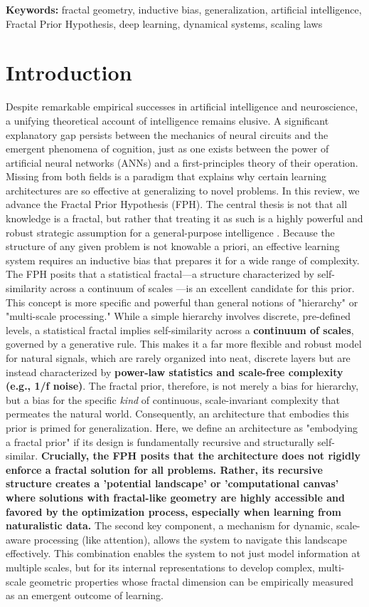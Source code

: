 \documentclass[11pt,a4paper]{article}
\newcommand{\keywords}[1]{%
\begin{center}
\small\textbf{Keywords:} #1
\end{center}
}
\begin{document}
\keywords{fractal geometry, inductive bias, generalization, artificial intelligence, Fractal Prior Hypothesis, deep learning, dynamical systems, scaling laws}

\section{Introduction}
Despite remarkable empirical successes in artificial intelligence and neuroscience, a unifying theoretical account of intelligence remains elusive. A significant explanatory gap persists between the mechanics of neural circuits and the emergent phenomena of cognition, just as one exists between the power of artificial neural networks (ANNs) and a first-principles theory of their operation. Missing from both fields is a paradigm that explains why certain learning architectures are so effective at generalizing to novel problems.
In this review, we advance the Fractal Prior Hypothesis (FPH). The central thesis is not that all knowledge is a fractal, but rather that treating it as such is a highly powerful and robust strategic assumption for a general-purpose intelligence \citep{marks-tarlow2020fractal}. Because the structure of any given problem is not knowable a priori, an effective learning system requires an inductive bias that prepares it for a wide range of complexity. The FPH posits that a statistical fractal—a structure characterized by self-similarity across a continuum of scales \citep{mandelbrot1983fractal}—is an excellent candidate for this prior. This concept is more specific and powerful than general notions of "hierarchy" or "multi-scale processing." While a simple hierarchy involves discrete, pre-defined levels, a statistical fractal implies self-similarity across a \textbf{continuum of scales}, governed by a generative rule. This makes it a far more flexible and robust model for natural signals, which are rarely organized into neat, discrete layers but are instead characterized by \textbf{power-law statistics and scale-free complexity (e.g., 1/f noise)}. The fractal prior, therefore, is not merely a bias for hierarchy, but a bias for the specific \textit{kind} of continuous, scale-invariant complexity that permeates the natural world.
Consequently, an architecture that embodies this prior is primed for generalization. Here, we define an architecture as "embodying a fractal prior" if its design is fundamentally recursive and structurally self-similar. \textbf{Crucially, the FPH posits that the architecture does not rigidly enforce a fractal solution for all problems. Rather, its recursive structure creates a 'potential landscape' or 'computational canvas' where solutions with fractal-like geometry are highly accessible and favored by the optimization process, especially when learning from naturalistic data.} The second key component, a mechanism for dynamic, scale-aware processing (like attention), allows the system to navigate this landscape effectively. This combination enables the system to not just model information at multiple scales, but for its internal representations to develop complex, multi-scale geometric properties whose fractal dimension can be empirically measured as an emergent outcome of learning.
\end{document}
